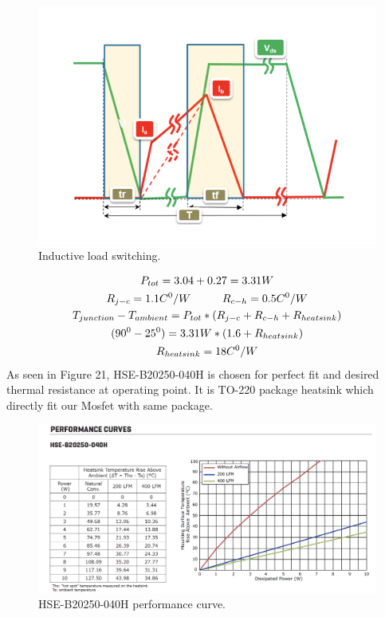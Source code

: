 \documentclass{article}
\newcommand\tab[1][1cm]{\hspace*{#1}}
\begin{document}
\begin{figure}[H]
    \centering
    \includegraphics[scale=0.6]{sw.png}
    \caption{Inductive load switching.}
    \label{fig:my_label}
\end{figure}
\begin{gather*}
    P_{tot}=3.04+0.27=3.31W\\
    R_{j-c}=1.1 C^0/W \tab   R_{c-h}=0.5 C^0/W\\
    T_{junction}-T_{ambient}= P_{tot}*( R_{j-c}+R_{c-h}+R_{heatsink})\\
    (90^0-25^0)=3.31W*(1.6+R_{heatsink})\\
    R_{heatsink}=18C^0/W \\
\end{gather*}
As seen in Figure 21, HSE-B20250-040H is chosen for perfect fit and desired thermal resistance at operating point. It is TO-220 package heatsink which directly fit our Mosfet with same package.

\begin{figure}[H]
    \centering
    \includegraphics[scale=0.4]{heatsnk.png}
    \caption{HSE-B20250-040H performance curve.}
    \label{fig:my_label}
\end{figure}
\end{document}
